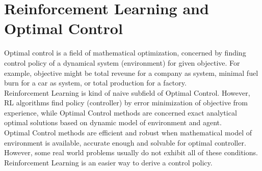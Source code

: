 \section{Reinforcement Learning and Optimal Control}
\label{sec:rl_and_control}
Optimal control is a field of mathematical optimization, concerned by  finding control policy of a dynamical system (environment) for given objective. For example, objective might be total reveune for a company as system, minimal fuel burn for a car as system, or total production for a factory. \\
Reinforcement Learning is kind of naive subfield of Optimal Control. However, RL algorithms find policy (controller) by error minimization of objective from experience, while Optimal Control methods are concerned exact analytical optimal solutions based on dynamic model of environment and agent. \\
Optimal Control methods are efficient and robust when mathematical model of environment is available, accurate enough and solvable for optimal controller. However, some real world problems usually do not exhibit all of these conditions. Reinforcement Learning is an easier way to derive a control policy.
